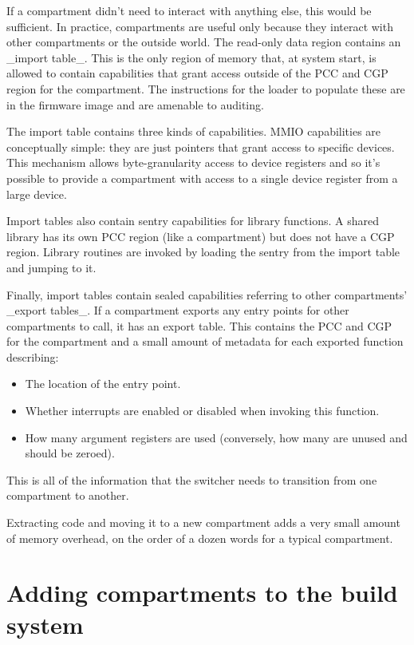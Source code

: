 If a compartment didn't need to interact with anything else, this would be sufficient.
In practice, compartments are useful only because they interact with other compartments or the outside world.
The read-only data region contains an _import table_.
This is the only region of memory that, at system start, is allowed to contain capabilities that grant access outside of the PCC and CGP region for the compartment.
The instructions for the loader to populate these are in the firmware image and are amenable to auditing.

The import table contains three kinds of capabilities.
MMIO capabilities are conceptually simple: they are just pointers that grant access to specific devices.
This mechanism allows byte-granularity access to device registers and so it's possible to provide a compartment with access to a single device register from a large device.

Import tables also contain sentry capabilities for library functions.
A shared library has its own PCC region (like a compartment) but does not have a CGP region.
Library routines are invoked by loading the sentry from the import table and jumping to it.

Finally, import tables contain sealed capabilities referring to other compartments' _export tables_.
If a compartment exports any entry points for other compartments to call, it has an export table.
This contains the PCC and CGP for the compartment and a small amount of metadata for each exported function describing:

\begin{itemize}
	\item{The location of the entry point.}
	\item{Whether interrupts are enabled or disabled when invoking this function.}
	\item{How many argument registers are used (conversely, how many are unused and should be zeroed).}
\end{itemize}

This is all of the information that the switcher needs to transition from one compartment to another.

Extracting code and moving it to a new compartment adds a very small amount of memory overhead, on the order of a dozen words for a typical compartment.

\section{Adding compartments to the build system}



